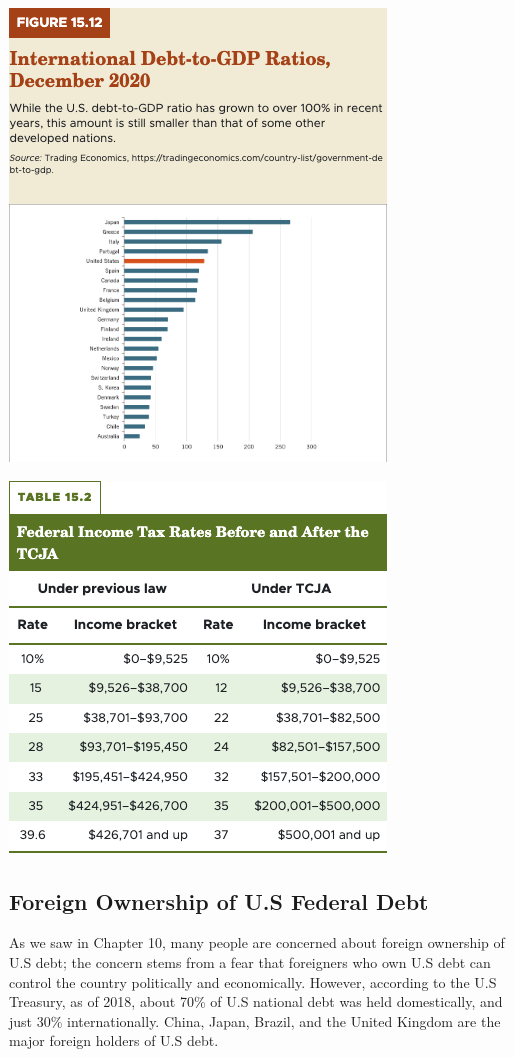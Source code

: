 \documentclass[11pt]{article} %
\begin{document}
\begin{center}
\includegraphics[scale=0.5]{images/Figure 15.12.png} 
\end{center}
\begin{center}
\includegraphics[scale=0.5]{images/Table 15.2.png} 
\end{center}

\subsection*{Foreign Ownership of U.S Federal Debt}
As we saw in Chapter 10, many people are concerned about foreign ownership of U.S debt; the concern stems from a fear that foreigners who own U.S debt can control the country politically and economically. However, according to the U.S Treasury, as of 2018, about 70\% of U.S national debt was held domestically, and just 30\% internationally. China, Japan, Brazil, and the United Kingdom are the major foreign holders of U.S debt.
\end{document}
